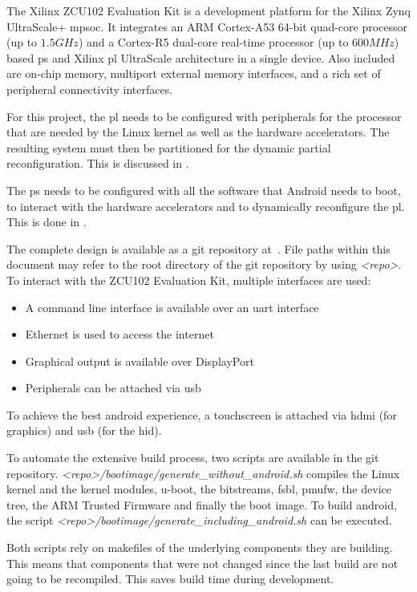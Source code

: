The Xilinx ZCU102 Evaluation Kit is a development platform for the Xilinx Zynq UltraScale+ \gls{mpsoc}.
It integrates an ARM Cortex-A53 64-bit quad-core processor (up to $1.5 GHz$) and a Cortex-R5 dual-core real-time processor (up to $600 MHz$) based \gls{ps} and Xilinx \gls{pl} UltraScale architecture in a single device. Also included are on-chip memory, multiport external memory interfaces, and a rich set of peripheral connectivity interfaces.

For this project, the \gls{pl} needs to be configured with peripherals for the
processor that are needed by the Linux kernel as well as the hardware
accelerators.
The resulting system must then be partitioned for the dynamic partial
reconfiguration.
This is discussed in .

The \gls{ps} needs to be configured with all the software that Android needs to
boot, to interact with the hardware accelerators and to dynamically reconfigure
the \gls{pl}.
This is done in .

The complete design is available as a git repository at~\cite{repo}.
File paths within this document may refer to the root directory of the git
repository by using \emph{<repo>}.
To interact with the ZCU102 Evaluation Kit, multiple interfaces are used:
\begin{itemize}
	\item A command line interface is available over an \gls{uart} interface
	\item Ethernet is used to access the internet
	\item Graphical output is available over DisplayPort
	\item Peripherals can be attached via \gls{usb}
\end{itemize}

To achieve the best android experience, a touchscreen is attached via \gls{hdmi} (for graphics) and \gls{usb} (for the \gls{hid}).

To automate the extensive build process, two scripts are available in the git
repository.
\emph{<repo>/bootimage/generate\_without\_android.sh} compiles the Linux kernel and the kernel modules, u-boot, the bitstreams, \gls{fsbl}, \gls{pmufw}, the device tree, the ARM Trusted Firmware and finally the boot image. To build android, the script \emph{<repo>/bootimage/generate\_including\_android.sh} can be executed.

Both scripts rely on makefiles of the underlying components they are building. This means that components that were not changed since the last build are not going to be recompiled. This saves build time during development.

